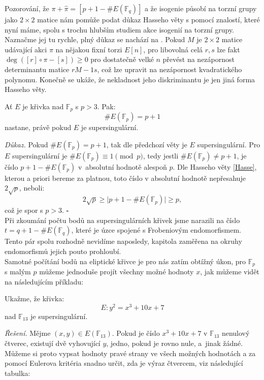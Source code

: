 \documentclass [12pt]{report}
\begin{document}
\begin{poznamka}
Pozorování, že $\pi+\widehat{\pi} = [p+1-\#E(\mathbb{F}_q)]$ a že isogenie působí na torzní grupy jako $2 \times 2$ matice nám pomůže podat důkaz Hasseho věty s pomocí znalostí, které nyní máme, spolu s trochu hlubším studiem akce isogenií na torzní grupy. Naznačme jej tu rychle, plný důkaz se nachází na \cite[Thm. 8.1, Thm. 7.17]{Sutherland}. Pokud $M$ je $2 \times 2$ matice udávající akci $\pi$ na nějakou fixní torzi $E[n]$, pro libovolná celá $r,s$ lze fakt $\deg ([r] \circ \pi -[s]) \geqslant 0$ pro dostatečně velké $n$ převést na nezápornost determinantu matice $r M - 1 s$, což lze upravit na nezápornost kvadratického polynomu. Konečně se ukáže, že nekladnost jeho diskriminantu je jen jiná forma Hasseho věty.
\end{poznamka}

\begin{dusledek}\label{super2}
Ať $E$ je křivka nad $\mathbb{F}_p$ s $p > 3$. Pak: $$\# E(\mathbb{F}_p) = p+1$$  nastane, právě pokud $E$ je supersingulární.
\end{dusledek}

\noindent \textit{Důkaz.} Pokud $\# E(\mathbb{F}_p) = p+1$, tak dle předchozí věty je $E$ supersingulární. Pro $E$ supersingulární je $\# E(\mathbb{F}_p) \equiv 1 \pmod{p}$, tedy jestli $\# E(\mathbb{F}_p) \neq p+1$, je číslo $p+1 - \# E(\mathbb{F}_p)$ v~absolutní hodnotě alespoň $p$. Dle Hasseho věty \ref{Hasse}, kterou a priori bereme za platnou, toto číslo v absolutní hodnotě nepřesahuje $2\sqrt{p}$, neboli:
\begin{equation*}
2\sqrt{p} \geqslant \vert p+1 - \# E(\mathbb{F}_p)\vert \geqslant p,
\end{equation*}
což je spor s $p > 3$. \hfill $\square$\\

Při zkoumání počtu bodů na supersingulárních křivek jsme narazili na číslo $t = q+1 - \# E(\mathbb{F}_q)$, které je úzce spojené s Frobeniovým endomorfismem. Tento pár spolu rozhodně nevidíme naposledy, kapitola zaměřena na okruhy endomorfismů jejich pouto prohloubí.\\

Samotné počítání bodů na eliptické křivce je pro nás zatím obtížný úkon, pro $\mathbb{F}_p$ s malým $p$ můžeme jednoduše projít všechny možné hodnoty $x$, jak můžeme vidět na následujícím příkladu:
\begin{priklad}
Ukažme, že křivka:
$$E: y^2 = x^3+10x+7$$
nad $\mathbb{F}_{13}$ je supersingulární.
\end{priklad}
\noindent \textit{Řešení.} Mějme $(x,y) \in E(\mathbb{F}_{13})$. Pokud je číslo $x^3+10x+7$ v $\mathbb{F}_{13}$ nenulový čtverec, existují dvě vyhovující $y$, jedno, pokud je rovno nule, a~jinak žádné. Můžeme si proto vypsat hodnoty pravé strany ve všech možných hodnotách a za pomocí Eulerova kritéria snadno určit, zda je výraz čtvercem, viz následující tabulka:
\end{document}

